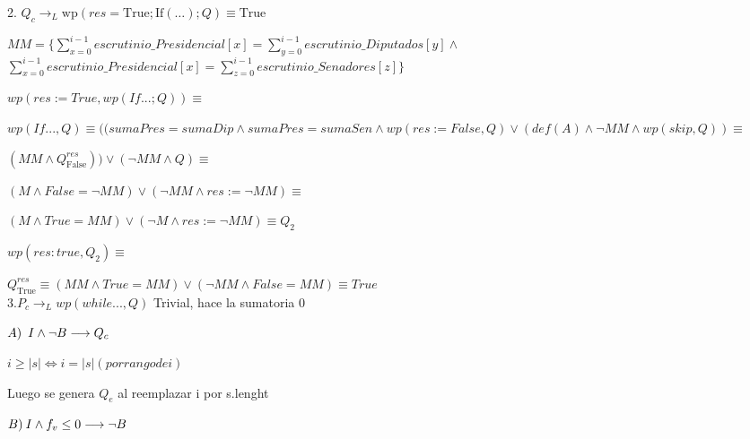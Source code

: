 \documentclass[10pt,a4paper]{article}
\begin{document}
{2. $Q_c \longrightarrow_{L} \text{wp}(res = \text{True}; \text{If}(\ldots); Q) \equiv \text{True}$} %

\vspace{3mm} 
$ MM = \{ \sum\limits_{x=0}^{i - 1} escrutinio\_Presidencial[x] =\sum\limits_{y=0}^{i - 1} escrutinio\_Diputados[y] \land $ 
\\ $\sum\limits_{x=0}^{i - 1} escrutinio\_Presidencial[x] = \sum\limits_{z=0}^{i - 1} escrutinio\_Senadores[z] \} $ 

\vspace{2mm} 

$wp(res := True, wp(If ...; Q)) \equiv $ %

$wp(If ..., Q) \equiv ((sumaPres = sumaDip  \land  sumaPres = sumaSen   \land  wp(res := False, Q) \lor (def (A) \land \neg MM \land wp(skip,Q)) \equiv $

$(MM \land Q^{res}_{\text{False}}) ) \lor (\neg MM \land Q) \equiv $
\vspace{2mm} \vspace{2mm} 

$(M \land False = \neg MM ) \lor (\neg MM \land res := \neg MM ) \equiv$
\vspace{2mm} 

$ (M \land True = MM ) \lor (\neg M \land res := \neg MM ) \equiv Q_2$\vspace{2mm} 

$wp(res:true, Q_2) \equiv$\vspace{2mm} \vspace{2mm} 

$Q^{res}_{\text{True}} \equiv (MM \land True = MM) \lor (\neg MM \land False=MM)\equiv True $
\vspace{2mm} \vspace{2mm} \\

${3. P_c \longrightarrow_{L} wp(while ... , Q)}$ 
Trivial, hace la sumatoria 0
\vspace{3mm} 

$\\ A) \; \: I \land \neg B  \longrightarrow Q_c $ 

 $i \geq |s| \Longleftrightarrow i = |s| (por rango de i) $ 

Luego se genera $Q_e$ al reemplazar i por s.lenght  %

{$\\ B) \: I \land f_v \leq 0 \longrightarrow \neg B$ }
\end{document}

